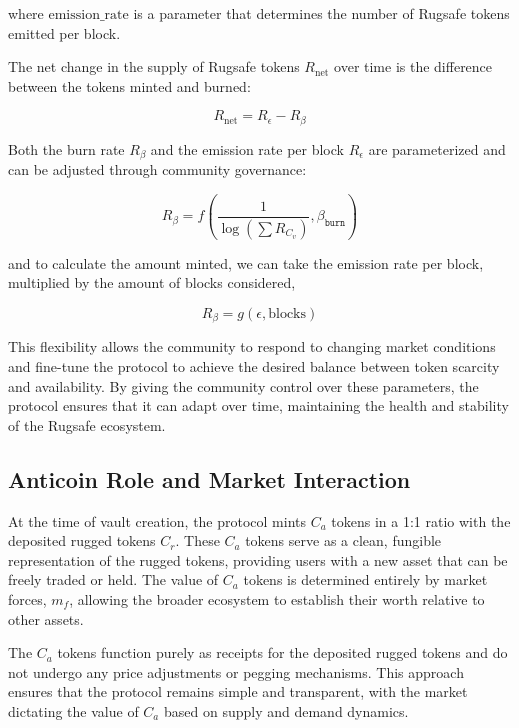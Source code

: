 \documentclass{article}
\begin{document}
where $\text{emission\_rate}$ is a parameter that determines the number of Rugsafe tokens emitted per block.

The net change in the supply of Rugsafe tokens $R_\text{net}$ over time is the difference between the tokens minted and burned:

\[
R_{\text{net}} = R_{\epsilon} - R_{\beta}
\]

Both the burn rate $R_{\beta}$ and the emission rate per block $R_\epsilon$ are parameterized and can be adjusted through community governance:

\[
R_\beta = f\left(\frac{1}{\log\left(\sum R_{C_v}\right)}, \beta_{\texttt{burn}}\right)
\]


and to calculate the amount minted, we can take the emission rate per block, multiplied by the amount of blocks considered,

\[
R_{\beta} = g(\epsilon, \text{blocks})
\]

This flexibility allows the community to respond to changing market conditions and fine-tune the protocol to achieve the desired balance between token scarcity and availability. By giving the community control over these parameters, the protocol ensures that it can adapt over time, maintaining the health and stability of the Rugsafe ecosystem.











\subsection{Anticoin Role and Market Interaction}
At the time of vault creation, the protocol mints $C_a$ tokens in a 1:1 ratio with the deposited rugged tokens $C_r$. These $C_a$ tokens serve as a clean, fungible representation of the rugged tokens, providing users with a new asset that can be freely traded or held. The value of $C_a$ tokens is determined entirely by market forces, \(m_f\), allowing the broader ecosystem to establish their worth relative to other assets.

The $C_a$ tokens function purely as receipts for the deposited rugged tokens and do not undergo any price adjustments or pegging mechanisms. This approach ensures that the protocol remains simple and transparent, with the market dictating the value of $C_a$ based on supply and demand dynamics.
\end{document}
